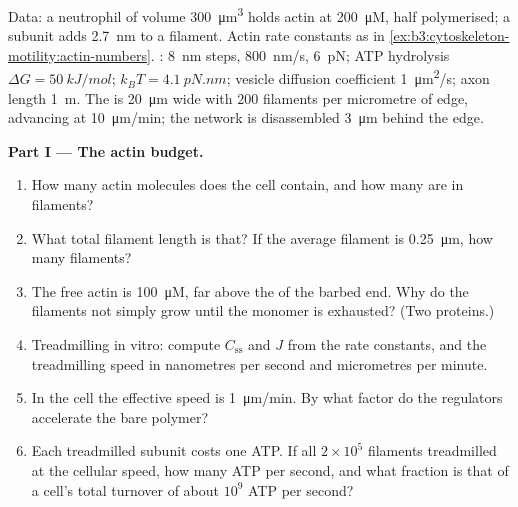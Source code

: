 \begin{problem}
\label{pb:b3:cytoskeleton-motility:1}
Data: a neutrophil of volume \qty{300}{\micro m^3} holds actin at
\qty{200}{\micro M}, half polymerised; a subunit adds \qty{2.7}{nm} to a
filament. Actin rate constants as in
\cref{ex:b3:cytoskeleton-motility:actin-numbers}. : \qty{8}{nm}
steps, \qty{800}{nm/s},  \qty{6}{pN}; ATP hydrolysis
$\Delta G = \qty{50}{kJ/mol}$; $k_{B}T = \qty{4.1}{pN.nm}$; vesicle
diffusion coefficient \qty{1}{\micro m^2/s}; axon length \qty{1}{m}. The
 is \qty{20}{\micro m} wide with $200$ filaments per
micrometre of edge, advancing at \qty{10}{\micro m/min}; the network
is disassembled \qty{3}{\micro m} behind the edge.

\medskip
\noindent\textbf{Part I --- The actin budget.}
\begin{enumerate}
  \item How many actin molecules does the cell contain, and how many
        are in filaments?
  \item What total filament length is that? If the average filament is
        \qty{0.25}{\micro m}, how many filaments?
  \item The free actin is \qty{100}{\micro M}, far above the  of the barbed end. Why do the filaments not
        simply grow until the monomer is exhausted? (Two proteins.)
  \item Treadmilling in vitro: compute $C_{\text{ss}}$ and $J$ from the
        rate constants, and the treadmilling speed in nanometres per
        second and micrometres per minute.
  \item In the cell the effective speed is \qty{1}{\micro m/min}. By
        what factor do the regulators accelerate the bare polymer?
  \item Each treadmilled subunit costs one ATP. If all $2\times 10^{5}$
        filaments treadmilled at the cellular speed, how many ATP per
        second, and what fraction is that of a cell's total turnover of
        about $10^{9}$ ATP per second?
\end{enumerate}


\end{problem}
